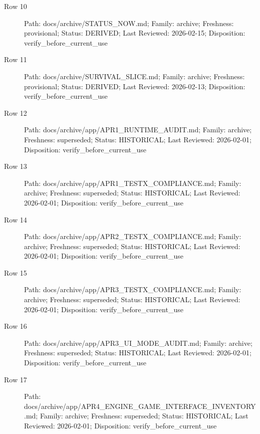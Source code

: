 \documentclass[10.5pt,a4paper,openany]{book}
\begin{document}
\begin{description}
\item[Row 10] Path: docs/\allowbreak{}archive/\allowbreak{}STATUS\_\allowbreak{}NOW.\allowbreak{}md; Family: archive; Freshness: provisional; Status: DERIVED; Last Reviewed: 2026-\allowbreak{}02-\allowbreak{}15; Disposition: verify\_\allowbreak{}before\_\allowbreak{}current\_\allowbreak{}use
\item[Row 11] Path: docs/\allowbreak{}archive/\allowbreak{}SURVIVAL\_\allowbreak{}SLICE.\allowbreak{}md; Family: archive; Freshness: provisional; Status: DERIVED; Last Reviewed: 2026-\allowbreak{}02-\allowbreak{}13; Disposition: verify\_\allowbreak{}before\_\allowbreak{}current\_\allowbreak{}use
\item[Row 12] Path: docs/\allowbreak{}archive/\allowbreak{}app/\allowbreak{}APR1\_\allowbreak{}RUNTIME\_\allowbreak{}AUDIT.\allowbreak{}md; Family: archive; Freshness: superseded; Status: HISTORICAL; Last Reviewed: 2026-\allowbreak{}02-\allowbreak{}01; Disposition: verify\_\allowbreak{}before\_\allowbreak{}current\_\allowbreak{}use
\item[Row 13] Path: docs/\allowbreak{}archive/\allowbreak{}app/\allowbreak{}APR1\_\allowbreak{}TESTX\_\allowbreak{}COMPLIANCE.\allowbreak{}md; Family: archive; Freshness: superseded; Status: HISTORICAL; Last Reviewed: 2026-\allowbreak{}02-\allowbreak{}01; Disposition: verify\_\allowbreak{}before\_\allowbreak{}current\_\allowbreak{}use
\item[Row 14] Path: docs/\allowbreak{}archive/\allowbreak{}app/\allowbreak{}APR2\_\allowbreak{}TESTX\_\allowbreak{}COMPLIANCE.\allowbreak{}md; Family: archive; Freshness: superseded; Status: HISTORICAL; Last Reviewed: 2026-\allowbreak{}02-\allowbreak{}01; Disposition: verify\_\allowbreak{}before\_\allowbreak{}current\_\allowbreak{}use
\item[Row 15] Path: docs/\allowbreak{}archive/\allowbreak{}app/\allowbreak{}APR3\_\allowbreak{}TESTX\_\allowbreak{}COMPLIANCE.\allowbreak{}md; Family: archive; Freshness: superseded; Status: HISTORICAL; Last Reviewed: 2026-\allowbreak{}02-\allowbreak{}01; Disposition: verify\_\allowbreak{}before\_\allowbreak{}current\_\allowbreak{}use
\item[Row 16] Path: docs/\allowbreak{}archive/\allowbreak{}app/\allowbreak{}APR3\_\allowbreak{}UI\_\allowbreak{}MODE\_\allowbreak{}AUDIT.\allowbreak{}md; Family: archive; Freshness: superseded; Status: HISTORICAL; Last Reviewed: 2026-\allowbreak{}02-\allowbreak{}01; Disposition: verify\_\allowbreak{}before\_\allowbreak{}current\_\allowbreak{}use
\item[Row 17] Path: docs/\allowbreak{}archive/\allowbreak{}app/\allowbreak{}APR4\_\allowbreak{}ENGINE\_\allowbreak{}GAME\_\allowbreak{}INTERFACE\_\allowbreak{}INVENTORY.\allowbreak{}md; Family: archive; Freshness: superseded; Status: HISTORICAL; Last Reviewed: 2026-\allowbreak{}02-\allowbreak{}01; Disposition: verify\_\allowbreak{}before\_\allowbreak{}current\_\allowbreak{}use

\end{description}
\end{document}
